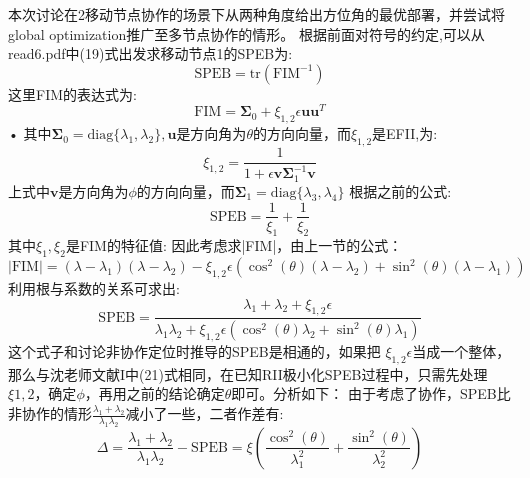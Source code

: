 \documentclass[12pt]{article}
\theoremstyle{remark}
\begin{document}
\title{\textbf{}} 

\author{}
\maketitle
\large
本次讨论在2移动节点协作的场景下从两种角度给出方位角的最优部署，并尝试将global optimization推广至多节点协作的情形。
根据前面对符号的约定,可以从read6.pdf中(19)式出发求移动节点1的SPEB为:
\begin{equation}
\text{SPEB}=\text{tr}(\text{FIM}^{-1})
\end{equation}
这里FIM的表达式为:
\begin{equation}
\text{FIM}=\bm{\Sigma}_0+\xi_{1,2}\epsilon\bm{u}\bm{u}^T
\end{equation}•
其中$\bm{\Sigma}_0=\text{diag}\{\lambda_1,\lambda_2\},\bm{u}$是方向角为$\theta$的方向向量，而$\xi_{1,2}$是EFII,为:
\begin{equation}
\xi_{1,2}=\frac{1}{1+\epsilon \bm{v}\bm{\Sigma}_1^{-1}\bm{v}}
\end{equation}
上式中$\bm{v}$是方向角为$\phi$的方向向量，而$\bm{\Sigma}_1=\text{diag}\{\lambda_3,\lambda_4\}$
根据之前的公式:
\begin{equation}
\text{SPEB}=\frac{1}{\xi_1}+\frac{1}{\xi_2}
\end{equation}
其中$\xi_1,\xi_2$是FIM的特征值:
因此考虑求|FIM|，由上一节的公式：
\begin{equation}
|\text{FIM}|=(\lambda-\lambda_1)(\lambda-\lambda_2)-\xi_{1,2}\epsilon(\cos^2(\theta)(\lambda-\lambda_2)+\sin^2(\theta)(\lambda-\lambda_1))
\end{equation}
利用根与系数的关系可求出:
\begin{equation}
\text{SPEB}=\frac{\lambda_1+\lambda_2+\xi_{1,2}\epsilon}{\lambda_1\lambda_2+\xi_{1,2}\epsilon(\cos^2(\theta)\lambda_2+\sin^2(\theta)\lambda_1)}
\end{equation}
这个式子和讨论非协作定位时推导的SPEB是相通的，如果把
$\xi_{1,2}\epsilon$当成一个整体，那么与沈老师文献I中(21)式相同，在已知RII极小化SPEB过程中，只需先处理$\xi{1,2}$，确定$\phi$，再用之前的结论确定$\theta$即可。分析如下：
由于考虑了协作，SPEB比非协作的情形$\frac{\lambda_1+\lambda_2}{\lambda_1\lambda_2}$减小了一些，二者作差有:
\begin{equation}\label{eq:Delta}
\Delta=\frac{\lambda_1+\lambda_2}{\lambda_1\lambda_2}-\text{SPEB}=\xi(\frac{\cos^2(\theta)}{\lambda_1^2}+\frac{\sin^2(\theta)}{\lambda_2^2})
\end{equation}
\end{document}
